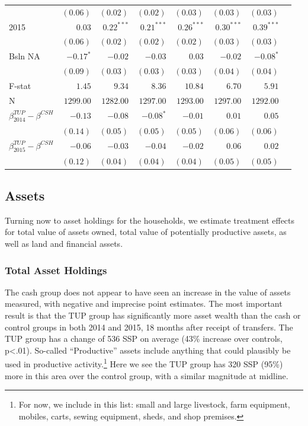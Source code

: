 \documentclass[12pt,article]{article}
\begin{document}
\begin{longtable}{lrrrrrrr}
 & $( 0.06)$ & $( 0.02)$ & $( 0.02)$ & $( 0.03)$ & $( 0.03)$ & $( 0.03)$\\
2015 & $0.03$ & $0.22^{***}$ & $0.21^{***}$ & $0.26^{***}$ & $0.30^{***}$ & $0.39^{***}$\\
 & $( 0.06)$ & $( 0.02)$ & $( 0.02)$ & $( 0.02)$ & $( 0.03)$ & $( 0.03)$\\
Bsln NA & $-0.17^{*}$ & $-0.02$ & $-0.03$ & $0.03$ & $-0.02$ & $-0.08^{*}$\\
 & $( 0.09)$ & $( 0.03)$ & $( 0.03)$ & $( 0.03)$ & $( 0.04)$ & $( 0.04)$\\
\hline
F-stat & $1.45$ & $9.34$ & $8.36$ & $10.84$ & $6.70$ & $5.91$\\
N & $1299.00$ & $1282.00$ & $1297.00$ & $1293.00$ & $1297.00$ & $1292.00$\\
\hline
$\beta^{TUP}_{2014}-\beta^{CSH}$ & $-0.13$ & $-0.08$ & $-0.08^{*}$ & $-0.01$ & $0.01$ & $0.05$\\
 & $( 0.14)$ & $( 0.05)$ & $( 0.05)$ & $( 0.05)$ & $( 0.06)$ & $( 0.06)$\\
$\beta^{TUP}_{2015}-\beta^{CSH}$ & $-0.06$ & $-0.03$ & $-0.04$ & $-0.02$ & $0.06$ & $0.02$\\
 & $( 0.12)$ & $( 0.04)$ & $( 0.04)$ & $( 0.04)$ & $( 0.05)$ & $( 0.05)$\\
\hline
\end{longtable}

\subsection*{Assets}
\label{sec-3-5}

Turning now to asset holdings for the households, we estimate treatment effects for total value of assets owned, total
value of potentially productive assets, as well as land and financial assets. 

\subsubsection*{Total Asset Holdings}
\label{sec-3-5-1}

The cash group does not appear to have seen an increase in the
value of assets measured, with negative and imprecise point estimates. The most
important result is that the TUP group has significantly more asset wealth than the
cash or control groups in both 2014 and 2015, 18 months after receipt of transfers.
The TUP group has a change of 536 SSP on average (43\% increase over controls, p<.01).
So-called ``Productive'' assets include anything that could plausibly be used in
productive activity.\footnote{For now, we include in this list: small and large
livestock, farm equipment, mobiles, carts, sewing equipment, sheds, and shop
premises.} Here we see the TUP group has 320 SSP (95\%) more in this area over the
control group, with a similar magnitude at midline.
\end{document}
